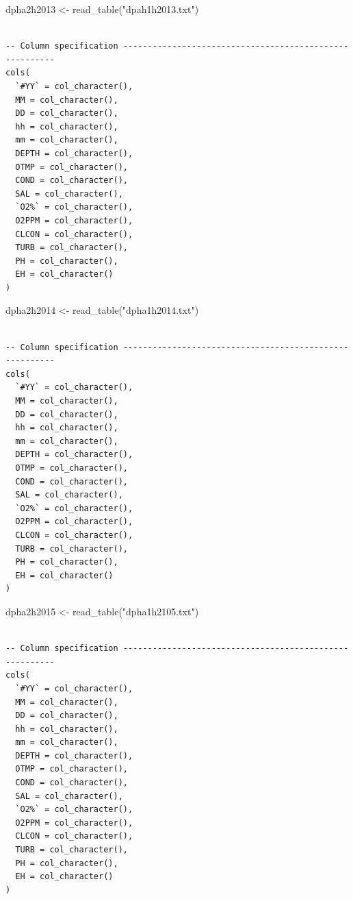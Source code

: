 \documentclass[
  letterpaper,
  DIV=11,
  numbers=noendperiod]{scrreprt}
\newenvironment{Shaded}{\begin{snugshade}}{\end{snugshade}}
\newcommand{\FunctionTok}[1]{\textcolor[rgb]{0.28,0.35,0.67}{#1}}
\newcommand{\NormalTok}[1]{\textcolor[rgb]{0.00,0.23,0.31}{#1}}
\newcommand{\OtherTok}[1]{\textcolor[rgb]{0.00,0.23,0.31}{#1}}
\newcommand{\StringTok}[1]{\textcolor[rgb]{0.13,0.47,0.30}{#1}}
\begin{document}
\begin{Shaded}
\begin{Highlighting}[]
\NormalTok{dpha2h2013 }\OtherTok{\textless{}{-}} \FunctionTok{read\_table}\NormalTok{(}\StringTok{"dpah1h2013.txt"}\NormalTok{)}
\end{Highlighting}
\end{Shaded}

\begin{verbatim}

-- Column specification --------------------------------------------------------
cols(
  `#YY` = col_character(),
  MM = col_character(),
  DD = col_character(),
  hh = col_character(),
  mm = col_character(),
  DEPTH = col_character(),
  OTMP = col_character(),
  COND = col_character(),
  SAL = col_character(),
  `O2%` = col_character(),
  O2PPM = col_character(),
  CLCON = col_character(),
  TURB = col_character(),
  PH = col_character(),
  EH = col_character()
)
\end{verbatim}

\begin{Shaded}
\begin{Highlighting}[]
\NormalTok{dpha2h2014 }\OtherTok{\textless{}{-}} \FunctionTok{read\_table}\NormalTok{(}\StringTok{"dpha1h2014.txt"}\NormalTok{)}
\end{Highlighting}
\end{Shaded}

\begin{verbatim}

-- Column specification --------------------------------------------------------
cols(
  `#YY` = col_character(),
  MM = col_character(),
  DD = col_character(),
  hh = col_character(),
  mm = col_character(),
  DEPTH = col_character(),
  OTMP = col_character(),
  COND = col_character(),
  SAL = col_character(),
  `O2%` = col_character(),
  O2PPM = col_character(),
  CLCON = col_character(),
  TURB = col_character(),
  PH = col_character(),
  EH = col_character()
)
\end{verbatim}

\begin{Shaded}
\begin{Highlighting}[]
\NormalTok{dpha2h2015 }\OtherTok{\textless{}{-}} \FunctionTok{read\_table}\NormalTok{(}\StringTok{"dpha1h2105.txt"}\NormalTok{)}
\end{Highlighting}
\end{Shaded}

\begin{verbatim}

-- Column specification --------------------------------------------------------
cols(
  `#YY` = col_character(),
  MM = col_character(),
  DD = col_character(),
  hh = col_character(),
  mm = col_character(),
  DEPTH = col_character(),
  OTMP = col_character(),
  COND = col_character(),
  SAL = col_character(),
  `O2%` = col_character(),
  O2PPM = col_character(),
  CLCON = col_character(),
  TURB = col_character(),
  PH = col_character(),
  EH = col_character()
)
\end{verbatim}
\end{document}
